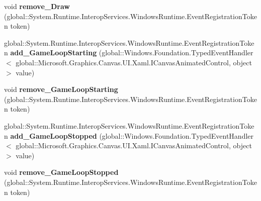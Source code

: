 \begin{DoxyCompactItemize}
\item 
\mbox{\label{class_microsoft_1_1_graphics_1_1_canvas_1_1_u_i_1_1_xaml_1_1_canvas_animated_control_a1c98ae37b09c9d6d53a47f8e303430ad}} 
void {\bfseries remove\+\_\+\+Draw} (global\+::\+System.\+Runtime.\+Interop\+Services.\+Windows\+Runtime.\+Event\+Registration\+Token token)
\item 
\mbox{\label{class_microsoft_1_1_graphics_1_1_canvas_1_1_u_i_1_1_xaml_1_1_canvas_animated_control_a1a3af8188976d58864922e96695f8eac}} 
global\+::\+System.\+Runtime.\+Interop\+Services.\+Windows\+Runtime.\+Event\+Registration\+Token {\bfseries add\+\_\+\+Game\+Loop\+Starting} (global\+::\+Windows.\+Foundation.\+Typed\+Event\+Handler$<$ global\+::\+Microsoft.\+Graphics.\+Canvas.\+U\+I.\+Xaml.\+I\+Canvas\+Animated\+Control, object $>$ value)
\item 
\mbox{\label{class_microsoft_1_1_graphics_1_1_canvas_1_1_u_i_1_1_xaml_1_1_canvas_animated_control_a45562438048578df83a897e93f9d1463}} 
void {\bfseries remove\+\_\+\+Game\+Loop\+Starting} (global\+::\+System.\+Runtime.\+Interop\+Services.\+Windows\+Runtime.\+Event\+Registration\+Token token)
\item 
\mbox{\label{class_microsoft_1_1_graphics_1_1_canvas_1_1_u_i_1_1_xaml_1_1_canvas_animated_control_a588a0abe17bd1d9b2363fef5d6a6acac}} 
global\+::\+System.\+Runtime.\+Interop\+Services.\+Windows\+Runtime.\+Event\+Registration\+Token {\bfseries add\+\_\+\+Game\+Loop\+Stopped} (global\+::\+Windows.\+Foundation.\+Typed\+Event\+Handler$<$ global\+::\+Microsoft.\+Graphics.\+Canvas.\+U\+I.\+Xaml.\+I\+Canvas\+Animated\+Control, object $>$ value)
\item 
\mbox{\label{class_microsoft_1_1_graphics_1_1_canvas_1_1_u_i_1_1_xaml_1_1_canvas_animated_control_a6e4ad589f4e74a8f247acdee86b8fb7b}} 
void {\bfseries remove\+\_\+\+Game\+Loop\+Stopped} (global\+::\+System.\+Runtime.\+Interop\+Services.\+Windows\+Runtime.\+Event\+Registration\+Token token)

\end{DoxyCompactItemize}
